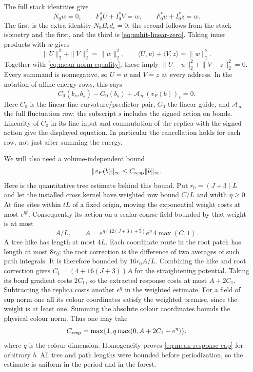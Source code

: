 The full stack identities give
\[
 N_0w=0,\qquad F_0^*U+I_0^*V=w,
 \qquad F_0^*u+I_0^*z=w.
\]
The first is the extra identity $N_0B_cd_c=0$; the second follows
from the stack isometry and the first, and the third is
\eqref{eq:unhit-linear-zero}. Taking inner products with $w$ gives
\[
 \|U\|_2^2+\|V\|_2^2=\|w\|_2^2,
 \qquad \langle U,u\rangle+\langle V,z\rangle=\|w\|_2^2.
\]
Together with \eqref{eq:mean-norm-equality}, these imply
$\|U-u\|_2^2+\|V-z\|_2^2=0$. Every summand is nonnegative,
so $U=u$ and $V=z$ at every address. In the notation of affine
energy rows, this says
\begin{equation}\label{eq:mean-stationary-zero}
 C_0(\overline{b_s},b_s)-G_0(b_s)
                 +\mathcal A_\infty(v_F(b))_s=0.
\end{equation}
Here $C_0$ is the linear fine-curvature/predictor pair, $G_0$ the
linear guide, and $\mathcal A_\infty$ the full fluctuation row;
the subscript $s$ includes the signed action on bonds. Linearity of
$C_0$ in its fine input and commutation of the replica with the signed
action give the displayed equation. In particular the cancellation
holds for each row, not just after summing the energy.

We will also need a volume-independent bound
\begin{equation}\label{eq:mean-response-cap}
 \|v_F(b)\|_\infty\le C_{\rm resp}\|b\|_\infty.
\end{equation}
Here is the quantitative tree estimate behind this bound. Put
$r_0=(J+3)L$ and let the installed cross kernel have weighted row
bound $C/L$ and width $\eta\ge0$. At fine sites within $tL$ of a
fixed origin, moving the exponential weight costs at most $e^{\eta t}$.
Consequently its action on a scalar coarse field bounded by that
weight is at most
\[
 A/L,\qquad
 A=e^{\eta(12(J+3)+5)}e^\eta\,4\max(C,1).
\]
A tree hike has length at most $4L$. Each coordinate route in the
root patch has length at most $8r_0$; the root correction is the
difference of two averages of such path integrals. It is therefore
bounded by $16r_0 A/L$. Combining the hike and root correction gives
$C_1=(4+16(J+3))A$ for the straightening potential. Taking its bond
gradient costs $2C_1$, so the extracted response costs at most
$A+2C_1$. Subtracting the replica costs another $e^\eta$ in the
weighted estimate. For a field of sup norm one all its colour
coordinates satisfy the weighted premise, since the weight is at
least one. Summing the absolute colour coordinates bounds the
physical colour norm. Thus one may take
\[
 C_{\rm resp}=\max\{1,q\max(0,A+2C_1+e^\eta)\},
\]
where $q$ is the colour dimension. Homogeneity proves
\eqref{eq:mean-response-cap} for arbitrary $b$. All tree and path
lengths were bounded before periodization, so the estimate is uniform
in the period and in the forest.

